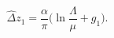 \begin{equation}
\hat\Delta z_1 = \frac{\alpha}{\pi}\Big(\ln\frac{\Lambda}{\mu} + g_1\Big).
\end{equation}

